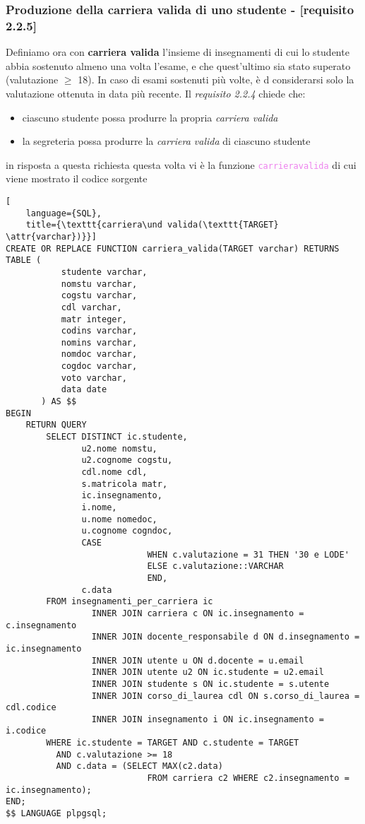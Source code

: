 \documentclass{article}
\newcommand{\attr}[1]{\texttt{\textcolor{gray}{#1}}}
\newcommand{\sqlfunc}[1]{\texttt{\textcolor{violet}{#1}}}
\newcommand{\und}[0]{\textunderscore}
\begin{document}
\subsubsection{Produzione della carriera valida di uno studente - [requisito 2.2.5]}
Definiamo ora con \textbf{carriera valida} l'insieme di insegnamenti di cui lo studente abbia sostenuto almeno una volta l'esame, e che quest'ultimo sia stato superato (valutazione $\geq$ 18). In caso di esami sostenuti più volte, è d considerarsi solo la valutazione ottenuta in data più recente.
Il \textit{requisito 2.2.4} chiede che:
\begin{itemize}
    \item ciascuno studente possa produrre la propria \textit{carriera valida}
    \item la segreteria possa produrre la \textit{carriera valida} di ciascuno studente
\end{itemize}
in risposta a questa richiesta questa volta vi è la funzione \sqlfunc{carriera\und valida} di cui viene mostrato il codice sorgente
\begin{lstlisting}[
    language={SQL},
    title={\texttt{carriera\und valida(\texttt{TARGET} \attr{varchar})}}]
CREATE OR REPLACE FUNCTION carriera_valida(TARGET varchar) RETURNS TABLE (
           studente varchar,
           nomstu varchar,
           cogstu varchar,
           cdl varchar,
           matr integer,
           codins varchar,
           nomins varchar,
           nomdoc varchar,
           cogdoc varchar,
           voto varchar,
           data date
       ) AS $$
BEGIN
    RETURN QUERY
        SELECT DISTINCT ic.studente,
               u2.nome nomstu,
               u2.cognome cogstu,
               cdl.nome cdl,
               s.matricola matr,
               ic.insegnamento,
               i.nome,
               u.nome nomedoc,
               u.cognome cogndoc,
               CASE
                            WHEN c.valutazione = 31 THEN '30 e LODE'
                            ELSE c.valutazione::VARCHAR
                            END,
               c.data
        FROM insegnamenti_per_carriera ic
                 INNER JOIN carriera c ON ic.insegnamento = c.insegnamento
                 INNER JOIN docente_responsabile d ON d.insegnamento = ic.insegnamento
                 INNER JOIN utente u ON d.docente = u.email
                 INNER JOIN utente u2 ON ic.studente = u2.email
                 INNER JOIN studente s ON ic.studente = s.utente
                 INNER JOIN corso_di_laurea cdl ON s.corso_di_laurea = cdl.codice
                 INNER JOIN insegnamento i ON ic.insegnamento = i.codice
        WHERE ic.studente = TARGET AND c.studente = TARGET
          AND c.valutazione >= 18
          AND c.data = (SELECT MAX(c2.data)
                            FROM carriera c2 WHERE c2.insegnamento = ic.insegnamento);
END;
$$ LANGUAGE plpgsql;
\end{lstlisting}
\end{document}
